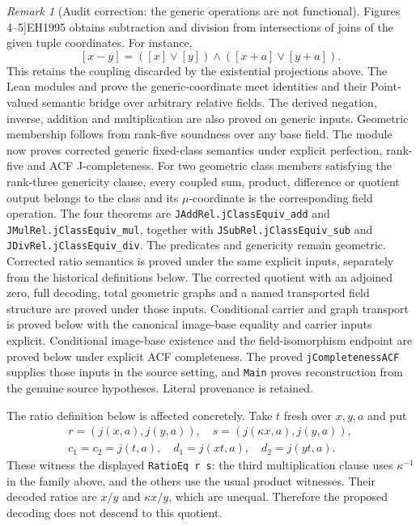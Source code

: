 \documentclass[11pt,oneside]{article}
\theoremstyle{definition}
\theoremstyle{remark}
\newtheorem{remark}[theorem]{Remark}
\newcommand{\lean}[1]{\nolinkurl{#1}}
\begin{document}
\begin{remark}[Audit correction: the generic operations are not functional]
Figures 4--5]{EH1995} obtains subtraction and division from intersections of joins
of the given tuple coordinates. For instance,
\[
 [x-y]=([x]\vee[y])\wedge([x+a]\vee[y+a]).
\]
This retains the coupling discarded by the existential projections above. The Lean
modules  and
 prove the generic-coordinate meet identities
and their Point-valued semantic bridge over arbitrary relative fields. The derived
negation, inverse, addition and multiplication are also proved on generic inputs.
Geometric membership follows from rank-five soundness over any base field.
The module  now proves corrected generic
fixed-class semantics under explicit perfection, rank-five and ACF J-completeness.
For two geometric class members satisfying the rank-three genericity clause, every
coupled sum, product, difference or quotient output belongs to the class and its
$\mu$-coordinate is the corresponding field operation. The four theorems are
\lean{JAddRel.jClassEquiv_add} and \lean{JMulRel.jClassEquiv_mul},
together with \lean{JSubRel.jClassEquiv_sub} and \lean{JDivRel.jClassEquiv_div}.
The predicates and genericity remain geometric. Corrected ratio semantics is proved under
the same explicit inputs, separately from the historical definitions below. The corrected
quotient with an adjoined zero, full decoding, total geometric graphs and a named transported
field structure are proved under those inputs. Conditional carrier and graph transport
is proved below with the canonical image-base equality and carrier inputs explicit.
Conditional image-base existence and the field-isomorphism endpoint are proved below under
explicit ACF completeness. The proved \lean{jCompletenessACF} supplies those inputs in
the source setting, and \lean{Main} proves reconstruction from the genuine source hypotheses.
Literal provenance is retained.

The ratio definition below is affected concretely. Take $t$ fresh over $x,y,a$ and put
\[
\begin{gathered}
 r=(j(x,a),j(y,a)),\quad s=(j(\kappa x,a),j(y,a)),\\
 c_1=c_2=j(t,a),\quad d_1=j(xt,a),\quad d_2=j(yt,a).
\end{gathered}
\]
These witness the displayed \lean{RatioEq r s}: the third multiplication clause uses
$\kappa^{-1}$ in the family above, and the others use the usual product witnesses.
Their decoded ratios are $x/y$ and $\kappa x/y$, which are unequal. Therefore the
proposed decoding does not descend to this quotient.


\end{remark}
\end{document}
